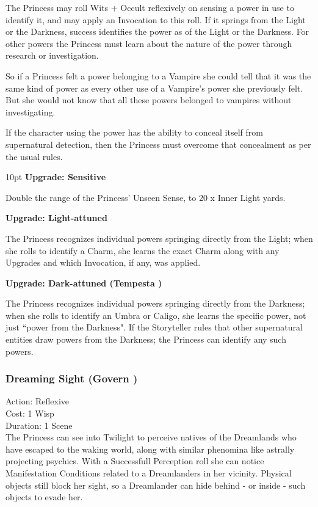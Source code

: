 The Princess may roll Wits + Occult reflexively on sensing a power in use to identify it, and may apply an Invocation to this roll. If it springs from the Light or the Darkness, success identifies the power as of the Light or the Darkness. For other powers  the Princess must learn about the nature of the power through research or investigation. 

So if a Princess felt a power belonging to a Vampire she could tell that it was the same kind of power as every other use of a Vampire's power she previously felt. But she would not know that all these powers belonged to vampires without investigating. 

If the character using the power has the ability to conceal itself from supernatural detection, then the Princess must overcome that concealment as per the usual rules.  

\begin{myindentpar}{10pt} \textbf{Upgrade: Sensitive}

Double the range of the Princess' Unseen Sense, to 20 x Inner Light yards.

\textbf{Upgrade: Light-attuned}

The Princess recognizes individual powers springing directly from the Light; when she rolls to identify a Charm, she learns the exact Charm along with any Upgrades and which Invocation, if any, was applied. 

\textbf{Upgrade: Dark-attuned (Tempesta \textbullet)}

The Princess recognizes individual powers springing directly from the Darkness; when she rolls to identify an Umbra or Caligo, she learns the specific power, not just \textquotedblleft power from the Darkness". If the Storyteller rules that other supernatural entities draw powers from the Darkness; the Princess can identify any such powers.\end{myindentpar}


\subsubsection*{Dreaming Sight (Govern \textbullet)}

\noindent Action: Reflexive\\ 

\noindent Cost: 1 Wisp\\ 

\noindent Duration: 1 Scene\\ 

\noindent The Princess can see into Twilight to perceive natives of the Dreamlands who have escaped to the waking world, along with similar phenomina like astrally projecting psychics. With a Successfull Perception roll she can notice Manifestation Conditions related to a Dreamlanders in her vicinity. Physical objects still block her sight, so a Dreamlander can hide behind - or inside - such objects to evade her.	

